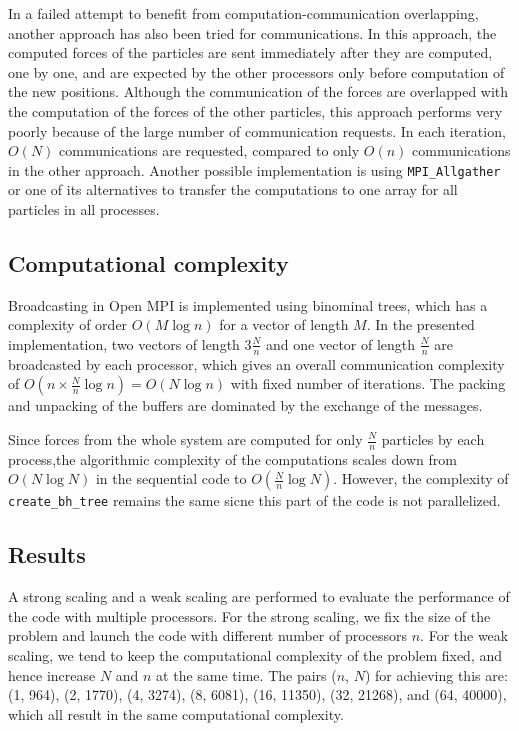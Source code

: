 \documentclass[10pt,journal,compsocconf]{IEEEtran}
\begin{document}
In a failed attempt to benefit from computation-communication overlapping, another approach has also been tried for communications. In this approach, the computed forces of the particles are sent immediately after they are computed, one by one, and are expected by the other processors only before computation of the new positions. Although the communication of the forces are overlapped with the computation of the forces of the other particles, this approach performs very poorly because of the large number of communication requests. In each iteration, $O(N)$ communications are requested, compared to only $O(n)$ communications in the other approach. Another possible implementation is using \texttt{MPI\_Allgather} or one of its alternatives to transfer the computations to one array for all particles in all processes.

\subsection{Computational complexity}

Broadcasting in Open MPI is implemented using binominal trees, which has a complexity of order $O(M \log n)$ for a vector of length $M$. In the presented implementation, two vectors of length $3 \frac{N}{n}$ and one vector of length $\frac{N}{n}$ are broadcasted by each processor, which gives an overall communication complexity of $O(n \times \frac{N}{n} \log n) = O(N \log n)$ with fixed number of iterations. The packing and unpacking of the buffers are dominated by the exchange of the messages.

Since forces from the whole system are computed for only $\frac{N}{n}$ particles by each process,the algorithmic complexity of the computations scales down from $O(N \log N)$ in the sequential code to $O(\frac{N}{n} \log N)$. However, the complexity of \texttt{create\_bh\_tree} remains the same sicne this part of the code is not parallelized.

\subsection{Results}

A strong scaling and a weak scaling are performed to evaluate the performance of the code with multiple processors. For the strong scaling, we fix the size of the problem and launch the code with different number of processors $n$. For the weak scaling, we tend to keep the computational complexity of the problem fixed, and hence increase $N$ and $n$ at the same time. The pairs ($n$, $N$) for achieving this are: (1, 964), (2, 1770), (4, 3274), (8, 6081), (16, 11350), (32, 21268), and (64, 40000), which all result in the same computational complexity.
\end{document}
